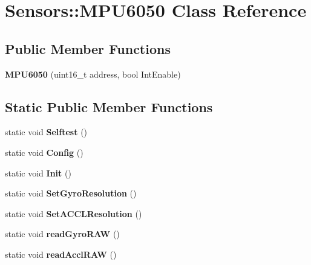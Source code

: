 \hypertarget{classSensors_1_1MPU6050}{}\section{Sensors\+::M\+P\+U6050 Class Reference}
\label{classSensors_1_1MPU6050}
\subsection*{Public Member Functions}
\begin{DoxyCompactItemize}
\item 
\mbox{\label{classSensors_1_1MPU6050_a4337504892ac68158e931db396394cb4}} 
{\bfseries M\+P\+U6050} (uint16\+\_\+t address, bool Int\+Enable)
\end{DoxyCompactItemize}
\subsection*{Static Public Member Functions}
\begin{DoxyCompactItemize}
\item 
\mbox{\label{classSensors_1_1MPU6050_ae486cc5f564bd74ad51a5cf6d891181a}} 
static void {\bfseries Selftest} ()
\item 
\mbox{\label{classSensors_1_1MPU6050_aff1ddd176379260467d6c9298ff4947e}} 
static void {\bfseries Config} ()
\item 
\mbox{\label{classSensors_1_1MPU6050_a99ea2843428bb6a5e1be7918f801c740}} 
static void {\bfseries Init} ()
\item 
\mbox{\label{classSensors_1_1MPU6050_a884ce6f3611872be1e2ae8edc2597148}} 
static void {\bfseries Set\+Gyro\+Resolution} ()
\item 
\mbox{\label{classSensors_1_1MPU6050_af55129df7e9ab209a493fd13769515b3}} 
static void {\bfseries Set\+A\+C\+C\+L\+Resolution} ()
\item 
\mbox{\label{classSensors_1_1MPU6050_a382126e687b83396014cbcbbc40d758c}} 
static void {\bfseries read\+Gyro\+R\+AW} ()
\item 
\mbox{\label{classSensors_1_1MPU6050_aa04bc07a49d6d7f187127c9fea171e8c}} 
static void {\bfseries read\+Accl\+R\+AW} ()
\end{DoxyCompactItemize}
